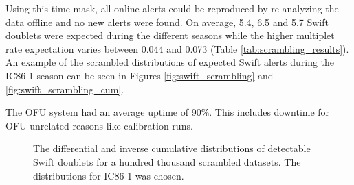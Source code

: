 Using this time mask, all online alerts could be reproduced by re-analyzing the 
data offline and no new alerts were found. On average, 5.4, 6.5 and 5.7 Swift 
doublets were expected during the different seasons while the higher multiplet 
rate expectation varies between 0.044 and 0.073 (Table 
\ref{tab:scrambling_results}). An example of the scrambled distributions of 
expected Swift alerts during the IC86-1 season can be seen in Figures
\ref{fig:swift_scrambling} and \ref{fig:swift_scrambling_cum}.

The OFU system had an average uptime of 90\%. 
This includes downtime for OFU unrelated reasons like calibration runs.

\begin{figure}[h]
\centering
 \captionsetup{width=.9\textwidth}
\caption{The differential and inverse cumulative distributions of 
detectable Swift doublets for a hundred thousand scrambled datasets. The 
distributions for 
IC86-1 was chosen.}
\end{figure}



